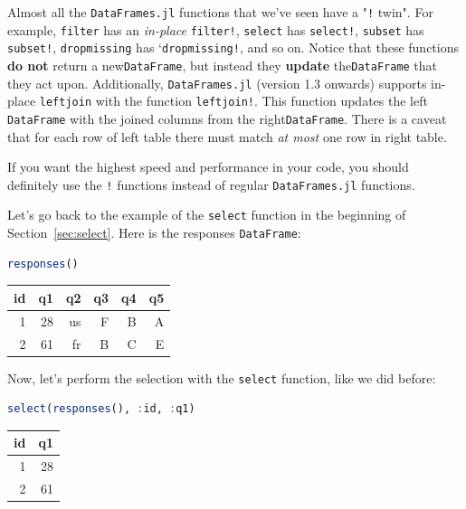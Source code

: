 \documentclass[
  notoc %
]{tufte-book}
\newcommand{\passthrough}[1]{#1}
\begin{document}
Almost all the \passthrough{\lstinline!DataFrames.jl!} functions that
we've seen have a "\passthrough{\lstinline"!"} twin". For example,
\passthrough{\lstinline!filter!} has an \emph{in-place}
\passthrough{\lstinline"filter!"}, \passthrough{\lstinline!select!} has
\passthrough{\lstinline"select!"}, \passthrough{\lstinline!subset!} has
\passthrough{\lstinline"subset!"}, \passthrough{\lstinline!dropmissing!}
has `\passthrough{\lstinline"dropmissing!"}, and so on. Notice that
these functions \textbf{do not} return a
new\passthrough{\lstinline!DataFrame!}, but instead they \textbf{update}
the\passthrough{\lstinline!DataFrame!} that they act upon. Additionally,
\passthrough{\lstinline!DataFrames.jl!} (version 1.3 onwards) supports
in-place \passthrough{\lstinline!leftjoin!} with the function
\passthrough{\lstinline"leftjoin!"}. This function updates the left
\passthrough{\lstinline!DataFrame!} with the joined columns from the
right\passthrough{\lstinline!DataFrame!}. There is a caveat that for
each row of left table there must match \emph{at most} one row in right
table.

If you want the highest speed and performance in your code, you should
definitely use the \passthrough{\lstinline"!"} functions instead of
regular \passthrough{\lstinline!DataFrames.jl!} functions.

Let's go back to the example of the \passthrough{\lstinline!select!}
function in the beginning of Section~\ref{sec:select}. Here is the
responses \passthrough{\lstinline!DataFrame!}:

\begin{lstlisting}[language=Julia]
responses()
\end{lstlisting}

\begin{longtable}[]{@{}rrrrrr@{}}
\toprule
id & q1 & q2 & q3 & q4 & q5 \\
\midrule
\endhead
1 & 28 & us & F & B & A \\
2 & 61 & fr & B & C & E \\
\bottomrule
\end{longtable}

Now, let's perform the selection with the
\passthrough{\lstinline!select!} function, like we did before:

\begin{lstlisting}[language=Julia]
select(responses(), :id, :q1)
\end{lstlisting}

\begin{longtable}[]{@{}rr@{}}
\toprule
id & q1 \\
\midrule
\endhead
1 & 28 \\
2 & 61 \\
\bottomrule
\end{longtable}
\end{document}

